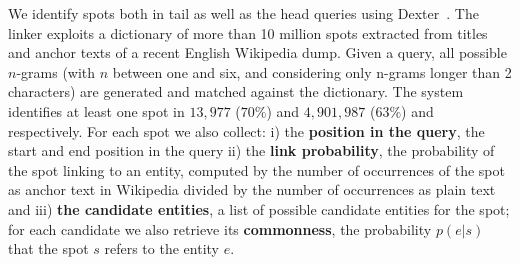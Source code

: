 We identify spots both in tail as well as the head queries %
using Dexter~\cite{ceccarelli2013dexter}. The linker exploits a dictionary of 
more than 10 million spots extracted 
from titles and anchor texts of a recent English Wikipedia dump. Given a query, 
all possible $n$-grams (with $n$ between one and six, and considering only n-grams 
longer than 2 characters) are generated and matched against the dictionary. The system identifies 
at least one spot in $13,977$ ($70\%$) and $4,901,987$ ($63\%$) \head{} and \tail{} 
respectively. For each spot we also collect: 
i) the \textbf{position in the query}, the start and end position in the query ii)
 the \textbf{link probability}, the probability
of the spot linking to an entity, computed by the number of occurrences of the spot 
as anchor text in Wikipedia divided by the number of occurrences as plain text and iii)
 \textbf{the candidate entities}, a list of possible candidate entities for the spot; 
 for each candidate we also retrieve its \textbf{commonness}, the probability $p(e|s)$ that
  the spot $s$ refers to the entity $e$.

